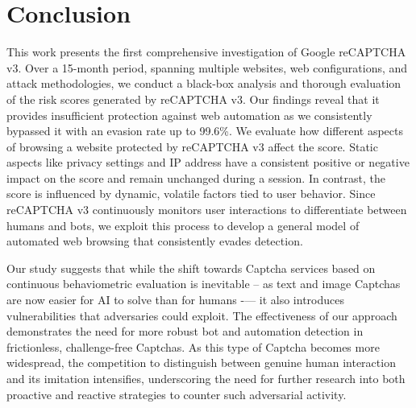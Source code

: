 \section{Conclusion}
\label{sec:conclusion}
This work presents the first comprehensive investigation of Google reCAPTCHA v3.
Over a 15-month period, spanning multiple websites, web configurations, and attack methodologies, we conduct a black-box analysis and thorough evaluation of the risk scores generated by reCAPTCHA v3.
Our findings reveal that it provides insufficient protection against web automation as we consistently bypassed it with an evasion rate up to 99.6\%.
We evaluate how different aspects of browsing a website protected by reCAPTCHA v3 affect the score.
Static aspects like privacy settings and IP address have a consistent positive or negative impact on the score and remain unchanged during a session.
In contrast, the score is influenced by dynamic, volatile factors tied to user behavior.
Since reCAPTCHA v3 continuously monitors user interactions to differentiate between humans and bots, we exploit this process to develop a general model of automated web browsing that consistently evades detection.

Our study suggests that while the shift towards Captcha services based on continuous behaviometric evaluation is inevitable -- as text and image Captchas are now easier for AI to solve than for humans -— it also introduces vulnerabilities that adversaries could exploit.
The effectiveness of our approach demonstrates the need for more robust bot and automation detection in frictionless, challenge-free Captchas.
As this type of Captcha becomes more widespread, the competition to distinguish between genuine human interaction and its imitation intensifies, underscoring the need for further research into both proactive and reactive strategies to counter such adversarial activity.